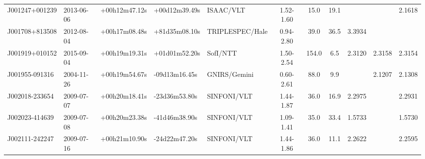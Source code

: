 \begin{landscape}
\begin{minipage}{\linewidth}
\begin{tabular}{lllllcccccc}
 J001247+001239 &  2013-06-06 &  +00h12m47.12s &  +00d12m39.49s &        ISAAC/VLT &  1.52-1.60 &      15.0 &  19.1 &         &         &  2.1618 \\
 J001708+813508 &  2012-08-04 &  +00h17m08.48s &  +81d35m08.10s &  TRIPLESPEC/Hale &  0.94-2.80 &      39.0 &  36.5 &  3.3934 &         &         \\
 J001919+010152 &  2015-09-04 &  +00h19m19.31s &  +01d01m52.20s &         SofI/NTT &  1.50-2.54 &     154.0 &   6.5 &  2.3120 &  2.3158 &  2.3154 \\
 J001955-091316 &  2004-11-26 &  +00h19m54.67s &  -09d13m16.45s &     GNIRS/Gemini &  0.60-2.61 &      88.0 &   9.9 &         &  2.1207 &  2.1308 \\
 J002018-233654 &  2009-07-07 &  +00h20m18.41s &  -23d36m53.80s &      SINFONI/VLT &  1.44-1.87 &      36.0 &  16.9 &  2.2975 &         &  2.2931 \\
 J002023-414639 &  2009-07-08 &  +00h20m23.38s &  -41d46m38.90s &      SINFONI/VLT &  1.09-1.41 &      35.0 &  33.4 &  1.5733 &         &  1.5730 \\
 J002111-242247 &  2009-07-16 &  +00h21m10.90s &  -24d22m47.20s &      SINFONI/VLT &  1.44-1.86 &      36.0 &  11.1 &  2.2622 &         &  2.2595 \\
    \bottomrule
    \end{tabular}
    \end{minipage}
\end{landscape}
